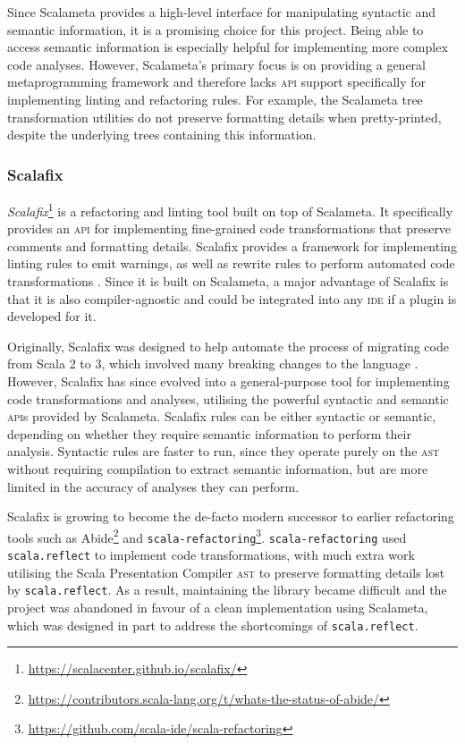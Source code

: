 Since Scalameta provides a high-level interface for manipulating syntactic and semantic information, it is a promising choice for this project.
Being able to access semantic information is especially helpful for implementing more complex code analyses.
However, Scalameta's primary focus is on providing a general metaprogramming framework and therefore lacks \textsc{api} support specifically for implementing linting and refactoring rules.
For example, the Scalameta tree transformation utilities do not preserve formatting details when pretty-printed, despite the underlying trees containing this information.

\subsubsection{Scalafix}
\textit{Scalafix}\footnote{\url{https://scalacenter.github.io/scalafix/}} is a refactoring and linting tool built on top of Scalameta.
It specifically provides an \textsc{api} for implementing fine-grained code transformations that preserve comments and formatting details.
Scalafix provides a framework for implementing linting rules to emit warnings, as well as rewrite rules to perform automated code transformations .
Since it is built on Scalameta, a major advantage of Scalafix is that it is also compiler-agnostic and could be integrated into any \textsc{ide} if a plugin is developed for it.

Originally, Scalafix was designed to help automate the process of migrating code from Scala 2 to 3, which involved many breaking changes to the language .
However, Scalafix has since evolved into a general-purpose tool for implementing code transformations and analyses, utilising the powerful syntactic and semantic \textsc{api}s provided by Scalameta.
Scalafix rules can be either syntactic or semantic, depending on whether they require semantic information to perform their analysis.
Syntactic rules are faster to run, since they operate purely on the \textsc{ast} without requiring compilation to extract semantic information, but are more limited in the accuracy of analyses they can perform.

Scalafix is growing to become the de-facto modern successor to earlier refactoring tools such as Abide\footnote{\url{https://contributors.scala-lang.org/t/whats-the-status-of-abide/}} and \texttt{scala-refactoring}\footnote{\url{https://github.com/scala-ide/scala-refactoring}}.
\texttt{scala-refactoring} used \texttt{scala.reflect} to implement code transformations, with much extra work utilising the Scala Presentation Compiler \textsc{ast} to preserve formatting details lost by \texttt{scala.reflect}.
As a result, maintaining the library became difficult and the project was abandoned in favour of a clean implementation using Scalameta, which was designed in part to address the shortcomings of \texttt{scala.reflect}.

